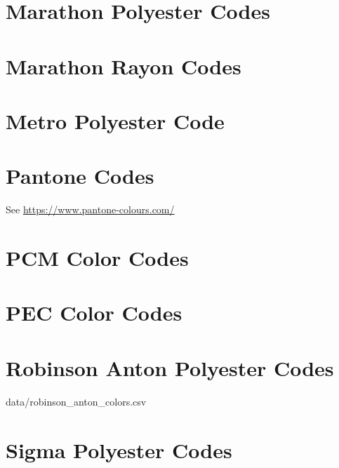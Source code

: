 \section{Marathon Polyester Codes}


\section{Marathon Rayon Codes}


\section{Metro Polyester Code}


\section{Pantone Codes}

See \url{https://www.pantone-colours.com/}


\section{PCM Color Codes}


\section{PEC Color Codes}


\section{Robinson Anton Polyester Codes}

%
{data/robinson_anton_colors.csv}

\section{Sigma Polyester Codes}

